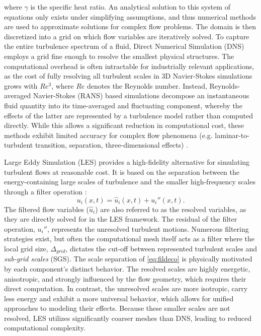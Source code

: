 \documentclass{article}
\begin{document}
where $\gamma$ is the specific heat ratio. An analytical solution to this system of equations only exists under simplifying assumptions, and thus numerical methods are used to approximate solutions for complex flow problems. The domain is then discretized into a grid on which flow variables are iteratively solved. To capture the entire turbulence spectrum of a fluid, Direct Numerical Simulation (DNS) employs a grid fine enough to resolve the smallest physical structures. The computational overhead is often intractable for industrially relevant applications, as the cost of fully resolving all turbulent scales in 3D Navier-Stokes simulations grows with $Re^3$, where $Re$ denotes the Reynolds number. Instead, Reynolds-averaged Navier-Stokes (RANS) based simulations decompose an instantaneous fluid quantity into its time-averaged and fluctuating component, whereby the effects of the latter are represented by a turbulence model rather than computed directly. While this allows a significant reduction in computational cost, these methods exhibit limited accuracy for complex flow phenomena (e.g. laminar-to-turbulent transition, separation, three-dimensional effects) \citep{wilcox1998turbulence}.

Large Eddy Simulation (LES) provides a high-fidelity alternative for simulating turbulent flows at reasonable cost. It is based on the separation between the energy-containing large scales of turbulence and the smaller high-frequency scales through a filter operation \citep{PopeBook}:
\begin{equation} \label{eq:fildeco}
    u_i(x, t) = \hat{u}_i(x,t) + u_i''(x,t).
\end{equation}  
The filtered flow variables ($\hat{u}_i$) are also referred to as the resolved variables, as they are directly solved for in the LES framework. The residual of the filter operation, $u_i''$, represents the unresolved turbulent motions. Numerous filtering strategies exist, but often the computational mesh itself acts as a filter where the local grid size, $\Delta_{grid}$, dictates the cut-off between represented turbulent scales and \textit{sub-grid scales} (SGS). The scale separation of \autoref{eq:fildeco} is physically motivated by each component's distinct behavior. The resolved scales are highly energetic, anisotropic, and strongly influenced by the flow geometry, which requires their direct computation. In contrast, the unresolved scales are more isotropic, carry less energy and exhibit a more universal behavior, which allows for unified approaches to modeling their effects. Because these smaller scales are not resolved, LES utilizes significantly coarser meshes than DNS, leading to reduced computational complexity.
\end{document}
